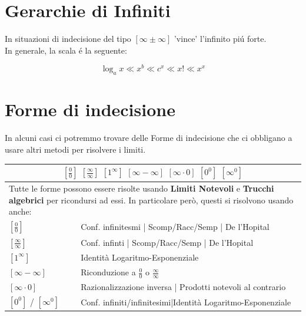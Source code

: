 \documentclass[12pt, a4paper, openany]{book}
\begin{document}
\pagebreak

\section{Gerarchie di Infiniti}
In situazioni di indecisione del tipo $[\infty \pm \infty]$ 'vince' l'infinito piú forte.
\\In generale, la scala é la seguente:

\begin{center}
	\[ \log_ax\ll x^b\ll c^x\ll x! \ll x^x \]
\end{center}

\section{Forme di indecisione}
In alcuni casi ci potremmo trovare delle Forme di indecisione che ci obbligano a usare altri metodi per risolvere i limiti.\\
\begin{tabularx}{\textwidth}{|l|X|}
	\hline
	\multicolumn{2}{|c|}{
		$[\frac{0}{0}]$ $[\frac{\infty}{\infty}]$ $[1^\infty]$ $[\infty - \infty]$ $[\infty \cdot 0]$ $[0^0]$ $[\infty^0]$
	}                                                                                       \\
	\hline
	\multicolumn{2}{|X|}{
		\small{Tutte le forme possono essere risolte usando \textbf{Limiti Notevoli} e \textbf{Trucchi algebrici} per ricondursi ad essi.
			In particolare però, questi si risolvono usando anche:}
	}                                                                                       \\
	\hline
	$[\frac{0}{0}]$           & Conf. infinitesmi | Scomp/Racc/Semp | De l'Hopital          \\
	\hline
	$[\frac{\infty}{\infty}]$ & Conf. infinti | Scomp/Racc/Semp | De l'Hopital              \\
	\hline
	$[1^\infty]$              & Identità Logaritmo-Esponenziale                             \\
	\hline
	$[\infty - \infty]$       & Riconduzione a $\frac{0}{0}$ o $\frac{\infty}{\infty}$      \\
	\hline
	$[\infty \cdot 0]$        & Razionalizzazione inversa | Prodotti notevoli al contrario  \\
	\hline
	$[0^0]$ / $[\infty^0]$    & Conf. infiniti/infinitesimi|Identità Logaritmo-Esponenziale \\
	\hline
\end{tabularx}
\end{document}
